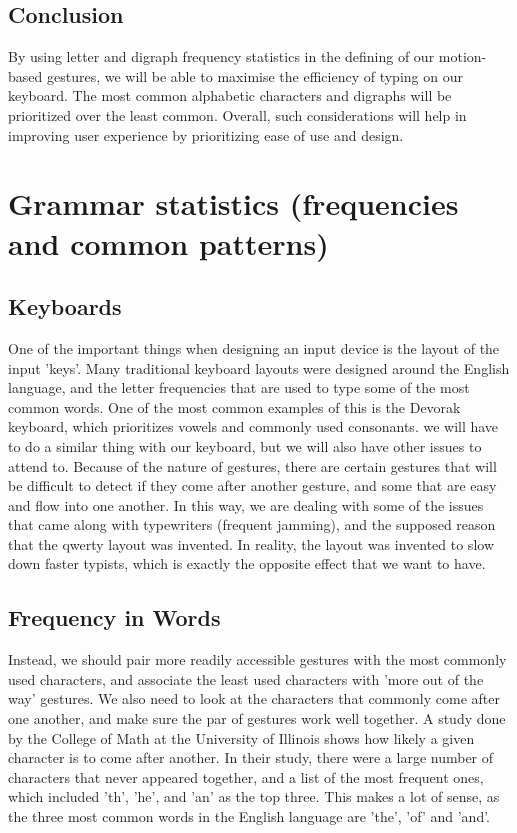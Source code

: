 \documentclass[onecolumn, draftclsnofoot,10pt, journal, letterpaper]{IEEEtran}
\begin{document}
    \subsection{Conclusion}
        By using letter and digraph frequency statistics in the defining of our motion-based gestures, we will be able to maximise the efficiency of typing on our keyboard. The most common alphabetic characters and digraphs will be prioritized over the least common. Overall, such considerations will help in improving user experience by prioritizing ease of use and design.
        
\section{Grammar statistics (frequencies and common patterns)}
    \subsection{Keyboards}
        One of the important things when designing an input device is the layout of the input 'keys'. Many traditional keyboard layouts were designed around the English language, and the letter frequencies that are used to type some of the most common words. One of the most common examples of this is the Devorak keyboard, which prioritizes vowels and commonly used consonants. \cite{randy_cassingham_dvorak_2019} we will have to do a similar thing with our keyboard, but we will also have other issues to attend to. Because of the nature of gestures, there are certain gestures that will be difficult to detect if they come after another gesture, and some that are easy and flow into one another. In this way, we are dealing with some of the issues that came along with typewriters (frequent jamming), and the supposed reason that the qwerty layout was invented. In reality, the layout was invented to slow down faster typists, which is exactly the opposite effect that we want to have. \cite{leah_welborn_why_2011}\par
    \subsection{Frequency in Words}
        Instead, we should pair more readily accessible gestures with the most commonly used characters, and associate the least used characters with 'more out of the way' gestures. We also need to look at the characters that commonly come after one another, and make sure the par of gestures work well together. A study done by the College of Math at the University of Illinois shows how likely a given character is to come after another. In their study, there were a large number of characters that never appeared together, and a list of the most frequent ones, which included 'th', 'he', and 'an' as the top three. \cite{jeffrey_s._leon_frequency_2008} This makes a lot of sense, as the three most common words in the English language are 'the', 'of' and 'and'. \cite{noauthor_100_2019}\par
\end{document}
